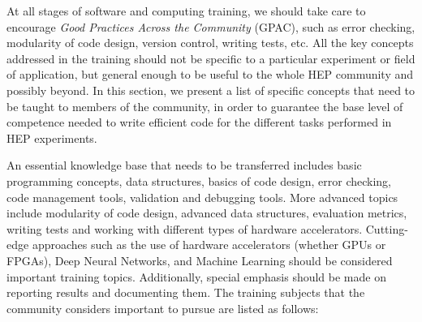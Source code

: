 At all stages of software and computing training, we should take care to encourage \emph{Good Practices Across the Community} (GPAC), such as error checking, modularity of code design, version control, writing tests, etc. All the key concepts addressed in the training should not be specific to a particular experiment or field of application, but general enough to be useful to the whole HEP community and possibly beyond. In this section, we present a list of specific concepts that need to be taught to members of the community, in order to guarantee the base level of competence needed to write efficient code for the different tasks performed in HEP experiments.
 
An essential knowledge base that needs to be transferred includes basic programming concepts, data structures, basics of code design, error checking, code management tools, validation and debugging tools. More advanced topics include modularity of code design, advanced data structures, evaluation metrics, writing tests and working with different types of hardware accelerators. Cutting-edge approaches such as the use of hardware accelerators (whether GPUs or FPGAs), Deep Neural Networks, and Machine Learning should be considered important training topics. Additionally, special emphasis should be made on reporting results and documenting them.
The training subjects that the community considers important to pursue are listed as follows:

